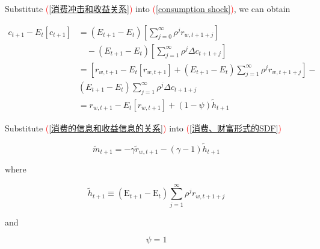 \documentclass{beamer}
\begin{document}
\begin{frame}[allowframebreaks]
\framebreak

Substitute \textcolor{red}{(\ref{消费冲击和收益关系})} into \textcolor{red}{(\ref{consumption shock})}, we can obtain

\begin{equation}
\begin{aligned}
c_{t+1} - E_t[c_{t+1}] &= (E_{t+1} - E_t) \left[\sum_{j=0}^{\infty} \rho^{j} r_{w, t+1+j} \right] \\
&\quad - (E_{t+1} - E_t) \left[\sum_{j=1}^{\infty} \rho^{j} \Delta c_{t+1+j} \right]\\
&= \left[r_{w,t+1} - E_t[r_{w,t+1}] + \left(E_{t+1}-E_t\right) \sum_{j=1}^{\infty} \rho^j r_{w, t+1+j}\right] - \\
&\left(E_{t+1}-E_t\right) \sum_{j=1}^{\infty} \rho^j \Delta c_{t+1+j} \\
&= r_{w,t+1} - E_t[r_{w,t+1}] + (1-\psi) \widetilde{h}_{t+1}\label{消费的信息和收益信息的关系}
\end{aligned}
\end{equation}


\framebreak

Substitute \textcolor{red}{(\ref{消费的信息和收益信息的关系})} into \textcolor{red}{(\ref{消费、财富形式的SDF})}

    \begin{tcolorbox}[colback=green!5!white, colframe=green!75!black, title=SDF Innovation (Without consumption)]
    \begin{equation*}
        \widetilde{m}_{t+1}=-\gamma \widetilde{r}_{w, t+1}-(\gamma-1) \widetilde{h}_{t+1} 
    \end{equation*}
    \end{tcolorbox}

where 

\begin{equation*}
    \widetilde{h}_{t+1}  \equiv \left(\mathrm{E}_{t+1}-\mathrm{E}_t\right) \sum_{j=1}^{\infty} \rho^j r_{w, t+1+j}
\end{equation*}

and

\begin{equation*}
    \psi = 1
\end{equation*}

\end{frame}
\end{document}
